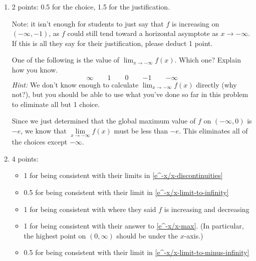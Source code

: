 \documentclass{article}
\begin{document}
\begin{enumerate}
\begin{enumerate}
  \item \label{e^-x/x-limit-to-minus-infinity}

    \begin{grading}
      2 points: 0.5 for the choice, 1.5 for the justification.

      Note: it isn't enough for students to just say that $f$ is increasing on $(-\infty, -1)$, as $f$ could still tend toward a horizontal asymptote as $x \to -\infty$. If this is all they say for their justification, please deduct 1 point. 
    \end{grading}

    \begin{problem}[\vfill]
      One of the following is the value of $\displaystyle \lim_{x \to -\infty} f(x)$. Which one? Explain how you know.
      \[ \infty \qquad 1 \qquad 0 \qquad {-1} \qquad {-\infty}\]
      \emph{Hint:} We don't know enough to calculate $\displaystyle \lim_{x \to -\infty} f(x)$ directly (why not?), but you should be able to use what you've done so far in this problem to eliminate all but 1 choice.
    \end{problem}

    \begin{solution}
      Since we just determined that the global maximum value of $f$ on $(-\infty, 0)$ is
      $-e$, we know that
      $\lim\limits_{x \to -\infty} f(x)$ must be less than $-e$. This eliminates
      all of the choices except $-\infty$.
    \end{solution}

  \item

    \begin{grading}
      4 points:
      \begin{itemize}[nosep]
      \item 1 for being consistent with their limits in \ref{e^-x/x-discontinuities}
      \item 0.5 for being consistent with their limit in \ref{e^-x/x-limit-to-infinity}
      \item 1 for being consistent with where they said $f$ is increasing and decreasing
      \item 1 for being consistent with their answer to \ref{e^-x/x-max}. (In particular, the highest point on $(0, \infty)$ should be under the $x$-axis.)
      \item 0.5 for being consistent with their limit in \ref{e^-x/x-limit-to-minus-infinity} 
      \end{itemize}
    \end{grading}


\end{enumerate}
\end{enumerate}
\end{document}
